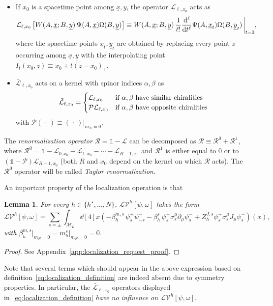 \documentclass[a4paper, 11pt]{article}
\newcommand{\id}{\mathds{1}}								%
\newcommand{\sing}[2]{{#1}^{#2}}							%
\newcommand{\loc}{\mathcal{L}}								%
\newcommand{\ren}{\mathcal{R}}								%
\newcommand{\src}{\omega}									%
\newcommand{\Src}{\Omega}
\newcommand{\torus}{{\scriptstyle{\mathbb{T}}}}				%
\theoremstyle{thm}
\newtheorem{lm}{Lemma}
\begin{document}
\begin{itemize}
\item If $x_0$ is a spacetime point among $\underline{x}, \underline{y}$, the operator $\loc_{\ell, x_0}$ acts as
\begin{equation}
\label{eq:taylor_localization_definition}
\loc_{\ell, x_0} \left[ W(A, \underline{x}; B, \underline{y}) \, \Psi(A, \underline{x})\Src(B, \underline{y}) \right] \equiv  W(A, \underline{x}; B, \underline{y}) \, \frac{1}{\ell!} \frac{\dd^\ell}{\dd t^\ell}\Psi(A, \underline{x}_t)\Src(B, \underline{y}_t) \eval_{t = 0},
\end{equation}
where the spacetime points $\underline{x}_t, \underline{y}_t$ are obtained by replacing every point $z$ occurring among $\underline{x}, \underline{y}$ with the interpolating point $I_t(x_0, z) \equiv x_0 + t(z - x_0)_\torus$.
\item $\bar{\loc}_{\ell, x_0}$ acts on a kernel with spinor indices $\alpha, \beta$ as
\begin{equation}
\bar{\loc}_{\ell, x_0}= 
\begin{cases}
\loc_{\ell, x_0}			& \textup{if } \alpha, \beta \textup{ have similar chiralities} \\
\mathcal{P}\loc_{\ell, x_0}	& \textup{if } \alpha, \beta \textup{ have opposite chiralities}
\end{cases}
\end{equation}
with $\mathcal{P}(\, \cdot \,) \equiv (\, \cdot \,) \vert_{m_N = 0}$.
\end{itemize}
The \emph{renormalization operator} $\ren = \id - \loc$ can be decomposed as $\ren \equiv \ren^0 + \ren^1$, where $\ren^0 = \id - \loc_{0, x_0} - \loc_{1, x_0} - \cdots - \loc_{R - 1, x_0}$ and $\ren^1$ is either equal to $0$ or to $(\id - \mathcal{P})\loc_{R - 1, x_0}$ (both $R$ and $x_0$ depend on the kernel on which $\ren$ acts). The $\ren^0$ operator will be called \emph{Taylor renormalization}.

An important property of the localization operation is that
\begin{lm}
\label{lm:localization_request}
For every $h \in \lbrace h^\star, \dots, N \rbrace$, $\loc \sing{\mathscr{V}}{h}[\psi, \src]$ takes the form
\begin{equation}
\label{eq:localization_request}
\loc \sing{\mathscr{V}}{h}[\psi, \src] =  \sum_{s = \pm} \int_{\mathcal{M}_L} \dd[4]{x} (-\beta^{m, s}_h \, \psi^+_s \psi^-_{-s} - \beta^s_h \, \psi^+_s \sigma_s^\mu \partial_\mu \psi^-_s + Z^{J, s}_h \psi^+_s \sigma_s^\mu J_\mu \psi^-_s)(x),
\end{equation}
with $\beta^{m, s}_h \vert_{m_N = 0} = m^s_h \vert_{m_N = 0} = 0$.
\end{lm}
\begin{proof}
See Appendix~\ref{app:localization_request_proof}.
\end{proof} 
Note that several terms which should appear in the above expression based on definition~\eqref{eq:localization_definition} are indeed absent due to symmetry properties. In particular, the $\bar{\loc}_{\ell, x_0}$ operators displayed in~\eqref{eq:localization_definition} \emph{have no influence on $\loc \sing{\mathscr{V}}{h}[\psi, \src]$}.
\end{document}
